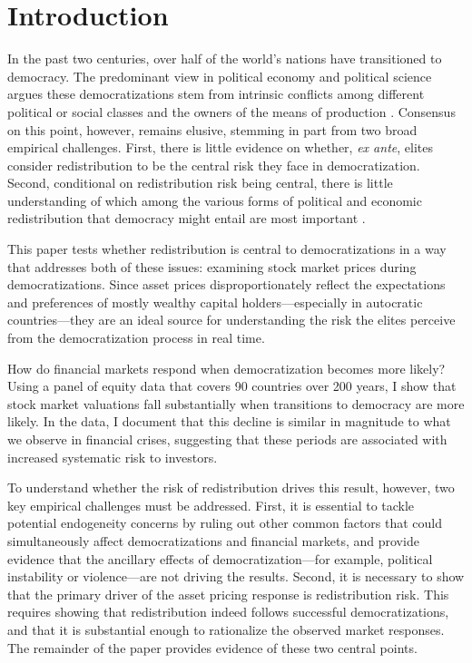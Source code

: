 
\section{Introduction}
 
In the past two centuries, over half of the world's nations have transitioned to democracy.  The predominant view in political economy and political science argues these democratizations stem from intrinsic conflicts among different political or social classes and the owners of the means of production \citep*{Marx1848,Lipset1959,Moore1966, Boix2003,Acemoglu2006,Ansell2010}.  Consensus on this point, however, remains elusive, stemming in part from two broad empirical challenges.  First, there is little evidence on whether, {\it ex ante}, elites consider redistribution to be the central risk they face in democratization. Second, conditional on redistribution risk being central,  there is little understanding of which among the various forms of political and economic redistribution that democracy might entail are most important \citep{Acemoglu2015}.

This paper tests whether redistribution is central to democratizations in a way that addresses both of these issues: examining stock market prices during democratizations. Since asset prices disproportionately reflect the expectations and preferences of mostly wealthy capital holders---especially in autocratic countries---they are an ideal source for understanding the risk the elites perceive from the democratization process in real time. 

How do financial markets respond when democratization becomes more likely? Using a panel of equity data that covers 90 countries over 200 years, I show that stock market valuations fall substantially when transitions to democracy are more likely.  In the data,  I document that this decline is similar in magnitude to what we observe in financial crises, suggesting that these periods are associated with increased systematic risk to investors.

To understand whether the risk of redistribution drives this result, however, two key empirical challenges must be addressed. First,  it is essential to tackle potential endogeneity concerns by ruling out other common factors that could simultaneously affect democratizations and financial markets, and provide evidence that the ancillary effects of democratization---for example, political instability or violence---are not driving the results. Second, it is necessary to show that the primary driver of the asset pricing response is redistribution risk. This requires showing that redistribution indeed follows successful democratizations,  and that it is substantial enough to rationalize the observed market responses.  The remainder of the paper provides evidence of these two central points.

